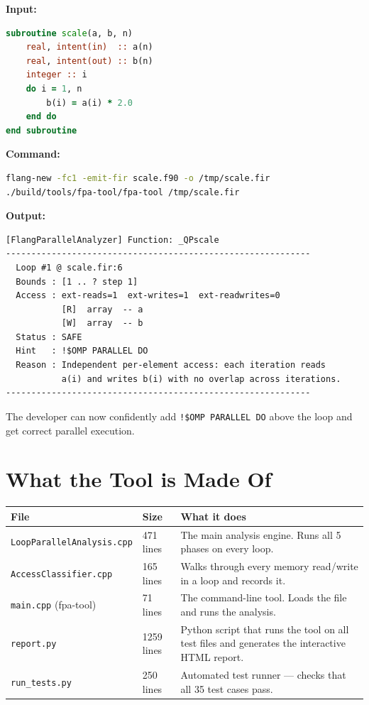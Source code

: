 \documentclass[12pt,a4paper]{article}
\begin{document}
\textbf{Input:}
\begin{lstlisting}[language=Fortran]
subroutine scale(a, b, n)
    real, intent(in)  :: a(n)
    real, intent(out) :: b(n)
    integer :: i
    do i = 1, n
        b(i) = a(i) * 2.0
    end do
end subroutine
\end{lstlisting}

\textbf{Command:}
\begin{lstlisting}[language=bash]
flang-new -fc1 -emit-fir scale.f90 -o /tmp/scale.fir
./build/tools/fpa-tool/fpa-tool /tmp/scale.fir
\end{lstlisting}

\textbf{Output:}
\begin{lstlisting}
[FlangParallelAnalyzer] Function: _QPscale
------------------------------------------------------------
  Loop #1 @ scale.fir:6
  Bounds : [1 .. ? step 1]
  Access : ext-reads=1  ext-writes=1  ext-readwrites=0
           [R]  array  -- a
           [W]  array  -- b
  Status : SAFE
  Hint   : !$OMP PARALLEL DO
  Reason : Independent per-element access: each iteration reads
           a(i) and writes b(i) with no overlap across iterations.
------------------------------------------------------------
\end{lstlisting}

The developer can now confidently add \texttt{!\$OMP PARALLEL DO}
above the loop and get correct parallel execution.

\section{What the Tool is Made Of}

\begin{center}
\begin{tabular}{p{5cm} p{2cm} p{7cm}}
\toprule
\textbf{File} & \textbf{Size} & \textbf{What it does} \\
\midrule
\texttt{LoopParallelAnalysis.cpp} & 471 lines &
  The main analysis engine. Runs all 5 phases on every loop. \\[4pt]
\texttt{AccessClassifier.cpp} & 165 lines &
  Walks through every memory read/write in a loop and records it. \\[4pt]
\texttt{main.cpp} (fpa-tool) & 71 lines &
  The command-line tool. Loads the file and runs the analysis. \\[4pt]
\texttt{report.py} & 1259 lines &
  Python script that runs the tool on all test files and generates the interactive HTML report. \\[4pt]
\texttt{run\_tests.py} & 250 lines &
  Automated test runner --- checks that all 35 test cases pass. \\
\bottomrule
\end{tabular}
\end{center}
\end{document}
